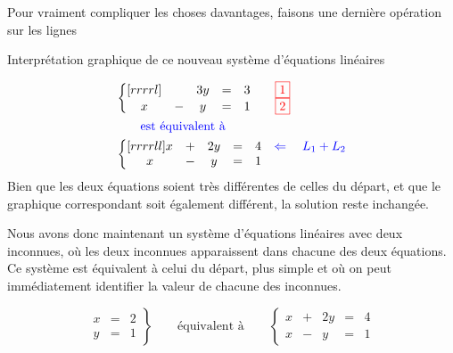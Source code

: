 Pour vraiment compliquer les choses davantages,
faisons une dernière opération sur les lignes
\begin{marginfigure}
			\caption{Interprétation graphique de ce nouveau système d'équations linéaires}
\end{marginfigure}

\begin{align*}
&\left\{
\begin{matrix}[rrrrl]
    &&3y&=& 3	\qquad {\scriptstyle\color{red}\fbox{1}}\\	
    x&-&y &=& 1\qquad {\scriptstyle\color{red}\fbox{2}}
\end{matrix}
\right.
\\
&\qquad\mbox{\color{blue} est équivalent à}\\
&\left\{
\begin{matrix}[rrrrll]
    x&+&2y&=& 4	&{\color{blue}\Leftarrow\quad L_1 + L_2}\\	
    x&-&y &=& 1
\end{matrix}
\right.
\end{align*}
Bien que les deux équations soient très différentes de celles
du départ, et que le graphique correspondant soit également
différent, la solution reste inchangée.

Nous avons donc maintenant un système d'équations linéaires avec deux inconnues, où les deux inconnues apparaissent dans chacune des deux équations. Ce système est équivalent à celui du départ, plus simple et où on peut immédiatement identifier
la valeur de chacune des inconnues.

\[
\left.
\begin{matrix}
    x &=& 2\\
    y &=& 1
\end{matrix}
\right\} \qquad\mbox{équivalent à}\qquad 
\left\{
\begin{matrix}
    x&+&2y&=& 4	\\	
    x&-&y &=& 1
\end{matrix}
\right.
\]
